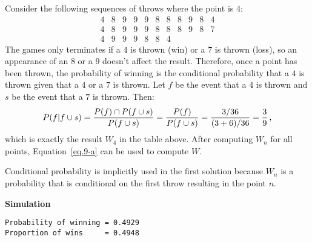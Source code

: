 
 Consider the following sequences of throws where the point is $4$:
\[
\begin{array}{rrrrrrrrrrr}
4 & 8 & 9 & 9 & 9 & 8 & 8 & 8 & 9 & 8 & 4\\
4 & 8 & 9 & 9 & 9 & 8 & 8 & 8 & 9 & 8 & 7\\
4 & 9 & 9 & 9 & 8 & 8 & 4
\end{array}
\]
The games only terminates if a $4$ is thrown (win) or a $7$ is thrown (loss), so an appearance of an $8$ or a $9$ doesn't affect the result. Therefore, once a point has been thrown, the probability of winning is the conditional probability that a $4$ is thrown given that a $4$ or  a $7$ is thrown. Let $f$ be the event that a $4$ is thrown and $s$ be the event that a $7$ is thrown. Then:
\[
P(f|f\cup s) = \displaystyle\frac{P(f)\cap P(f\cup s)}{P(f\cup s)}=\displaystyle\frac{P(f)}{P(f\cup s)}=\displaystyle\frac{3/36}{(3+6)/36}=\displaystyle\frac{3}{9}\,,
\]
which is exactly the result $W_4$ in the table above. After computing $W_n$ for all points, Equation~\ref{eq.9-a} can be used to compute $W$.

Conditional probability is implicitly used in the first solution because $W_n$ is a probability that is conditional on the first throw resulting in the point $n$.

\textbf{Simulation}
\begin{verbatim}
Probability of winning = 0.4929
Proportion of wins     = 0.4948
\end{verbatim}



